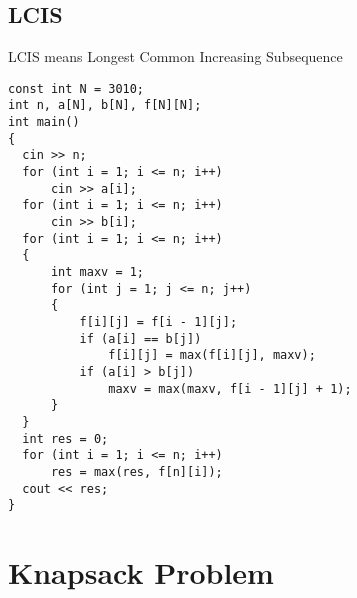 \subsection{LCIS}
LCIS means Longest Common Increasing Subsequence
\begin{lstlisting}
const int N = 3010;
int n, a[N], b[N], f[N][N];
int main()
{
  cin >> n;
  for (int i = 1; i <= n; i++)
      cin >> a[i];
  for (int i = 1; i <= n; i++)
      cin >> b[i];
  for (int i = 1; i <= n; i++)
  {
      int maxv = 1;
      for (int j = 1; j <= n; j++)
      {
          f[i][j] = f[i - 1][j];
          if (a[i] == b[j])
              f[i][j] = max(f[i][j], maxv);
          if (a[i] > b[j])
              maxv = max(maxv, f[i - 1][j] + 1);
      }
  }
  int res = 0;
  for (int i = 1; i <= n; i++)
      res = max(res, f[n][i]);
  cout << res;
}
\end{lstlisting}
\section{Knapsack Problem}

